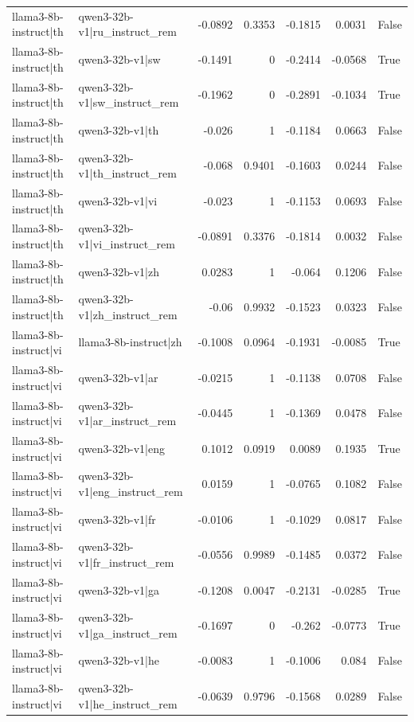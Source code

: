 \begin{table}
\begin{tabular}{l l r r r r l}
llama3-8b-instruct|th & qwen3-32b-v1|ru_instruct_rem & -0.0892 & 0.3353 & -0.1815 & 0.0031 & False \\
llama3-8b-instruct|th & qwen3-32b-v1|sw & -0.1491 & 0 & -0.2414 & -0.0568 & True \\
llama3-8b-instruct|th & qwen3-32b-v1|sw_instruct_rem & -0.1962 & 0 & -0.2891 & -0.1034 & True \\
llama3-8b-instruct|th & qwen3-32b-v1|th & -0.026 & 1 & -0.1184 & 0.0663 & False \\
llama3-8b-instruct|th & qwen3-32b-v1|th_instruct_rem & -0.068 & 0.9401 & -0.1603 & 0.0244 & False \\
llama3-8b-instruct|th & qwen3-32b-v1|vi & -0.023 & 1 & -0.1153 & 0.0693 & False \\
llama3-8b-instruct|th & qwen3-32b-v1|vi_instruct_rem & -0.0891 & 0.3376 & -0.1814 & 0.0032 & False \\
llama3-8b-instruct|th & qwen3-32b-v1|zh & 0.0283 & 1 & -0.064 & 0.1206 & False \\
llama3-8b-instruct|th & qwen3-32b-v1|zh_instruct_rem & -0.06 & 0.9932 & -0.1523 & 0.0323 & False \\
llama3-8b-instruct|vi & llama3-8b-instruct|zh & -0.1008 & 0.0964 & -0.1931 & -0.0085 & True \\
llama3-8b-instruct|vi & qwen3-32b-v1|ar & -0.0215 & 1 & -0.1138 & 0.0708 & False \\
llama3-8b-instruct|vi & qwen3-32b-v1|ar_instruct_rem & -0.0445 & 1 & -0.1369 & 0.0478 & False \\
llama3-8b-instruct|vi & qwen3-32b-v1|eng & 0.1012 & 0.0919 & 0.0089 & 0.1935 & True \\
llama3-8b-instruct|vi & qwen3-32b-v1|eng_instruct_rem & 0.0159 & 1 & -0.0765 & 0.1082 & False \\
llama3-8b-instruct|vi & qwen3-32b-v1|fr & -0.0106 & 1 & -0.1029 & 0.0817 & False \\
llama3-8b-instruct|vi & qwen3-32b-v1|fr_instruct_rem & -0.0556 & 0.9989 & -0.1485 & 0.0372 & False \\
llama3-8b-instruct|vi & qwen3-32b-v1|ga & -0.1208 & 0.0047 & -0.2131 & -0.0285 & True \\
llama3-8b-instruct|vi & qwen3-32b-v1|ga_instruct_rem & -0.1697 & 0 & -0.262 & -0.0773 & True \\
llama3-8b-instruct|vi & qwen3-32b-v1|he & -0.0083 & 1 & -0.1006 & 0.084 & False \\
llama3-8b-instruct|vi & qwen3-32b-v1|he_instruct_rem & -0.0639 & 0.9796 & -0.1568 & 0.0289 & False \\

\end{tabular}
\end{table}
